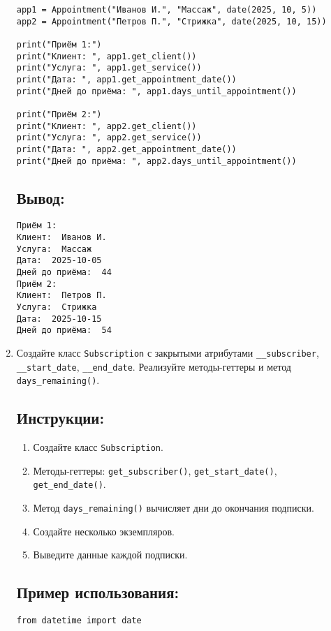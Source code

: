 \begin{enumerate}
\begin{lstlisting}[caption=Пример кода]
app1 = Appointment("Иванов И.", "Массаж", date(2025, 10, 5))
app2 = Appointment("Петров П.", "Стрижка", date(2025, 10, 15))

print("Приём 1:")
print("Клиент: ", app1.get_client())
print("Услуга: ", app1.get_service())
print("Дата: ", app1.get_appointment_date())
print("Дней до приёма: ", app1.days_until_appointment())

print("Приём 2:")
print("Клиент: ", app2.get_client())
print("Услуга: ", app2.get_service())
print("Дата: ", app2.get_appointment_date())
print("Дней до приёма: ", app2.days_until_appointment())
\end{lstlisting}

\subsection*{Вывод:}
\begin{lstlisting}[caption=Ожидаемый вывод]
Приём 1:
Клиент:  Иванов И.
Услуга:  Массаж
Дата:  2025-10-05
Дней до приёма:  44
Приём 2:
Клиент:  Петров П.
Услуга:  Стрижка
Дата:  2025-10-15
Дней до приёма:  54
\end{lstlisting}
\item
Создайте класс \texttt{Subscription} с закрытыми атрибутами \texttt{\_\_subscriber}, \texttt{\_\_start\_date}, \texttt{\_\_end\_date}. Реализуйте методы-геттеры и метод \texttt{days\_remaining()}.

\subsection*{Инструкции:}
\begin{enumerate}
    \item Создайте класс \texttt{Subscription}.
    \item Методы-геттеры: \texttt{get\_subscriber()}, \texttt{get\_start\_date()}, \texttt{get\_end\_date()}.
    \item Метод \texttt{days\_remaining()} вычисляет дни до окончания подписки.
    \item Создайте несколько экземпляров.
    \item Выведите данные каждой подписки.
\end{enumerate}

\subsection*{Пример использования:}
\begin{lstlisting}[caption=Пример кода]
from datetime import date


\end{lstlisting}
\end{enumerate}
